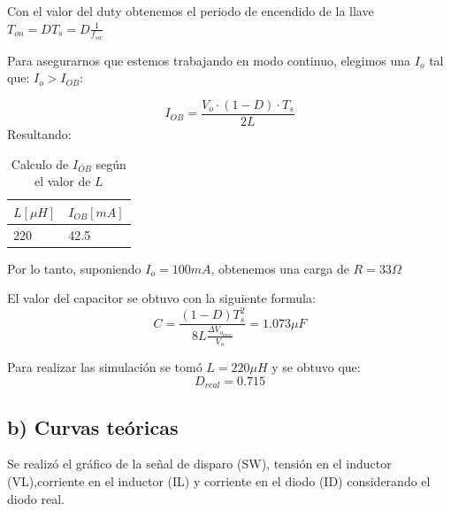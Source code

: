 \documentclass[e4_tp1_main.tex]{subfiles}
\begin{document}
Con el valor del duty obtenemos el periodo de encendido de la llave $T_{on}=D T_s=D \frac{1}{f_{sw}}$


Para asegurarnos que estemos trabajando en modo continuo, elegimos una $I_{o}$ tal que: $I_{o}>I_{OB}$:

\[
I_{OB} = \frac{V_o \cdot (1-D) \cdot T_s}{2L}
\]
Resultando: 

\begin{table}[H]
\centering
\begin{tabular}{|l|l|}
\hline
\multicolumn{1}{|c|}{$L [\mu H]$} & {$I_{OB} [mA]$}    \\ \hline
220                   & 42.5   \\ \hline

\end{tabular}
\caption{Calculo de $I_{OB}$ seg\'un el valor de $L$}
\label{tabla:calculo de Iob}
\end{table}

Por lo tanto, suponiendo $I_o=100mA$, obtenemos una carga de $R=33\Omega$



El valor del capacitor se obtuvo con la siguiente formula:
$$C=\frac{(1-D)T_{s}^{2}}{8L\frac{\Delta V_{o_{max}}}{V_o}}=1.073\mu F$$

Para realizar las simulaci\'on se tom\'o  $L=220\mu H$ y se obtuvo que: 
$$D_{real}=0.715$$

\subsection*{b) Curvas teóricas}

Se realiz\'o el gr\'afico de la señal de disparo (SW), tensión en el inductor (VL),corriente en el inductor (IL) y corriente en el diodo (ID) considerando el diodo real. 
\end{document}
